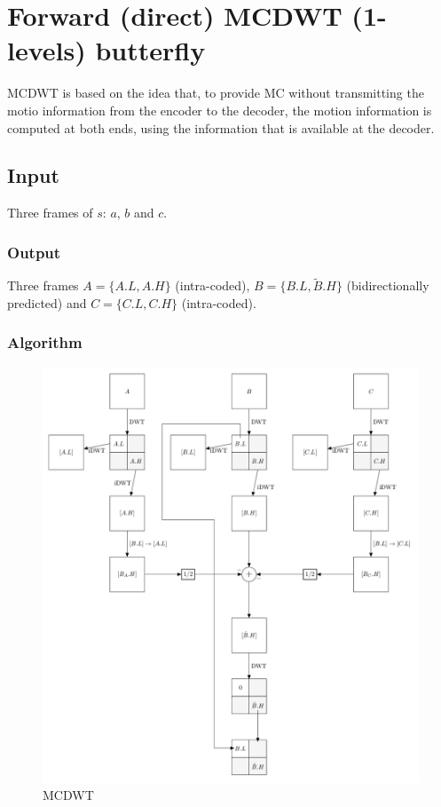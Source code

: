\section{Forward (direct) MCDWT (1-levels) butterfly}
MCDWT is based on the idea that, to provide MC without transmitting the
motio information from the encoder to the decoder, the motion
information is computed at both ends, using the information that is
available at the decoder.

\subsection{Input}
Three frames of \(s\): \(a\), \(b\) and \(c\).

\subsubsection{Output}
Three frames \(A=\{A.L, A.H\}\) (intra-coded),
\(B=\{B.L, \tilde{B}.H\}\) (bidirectionally predicted) and
\(C=\{C.L, C.H\}\) (intra-coded).

\subsubsection{Algorithm}
\begin{figure}
\centering
\includegraphics{forward.png}
\caption{MCDWT}
\end{figure}


